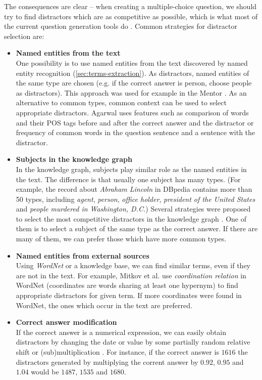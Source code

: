 \documentclass[a4paper, 12pt, twoside]{fithesis2}		%
\renewcommand{\_}{\leavevmode \kern0.07em\vbox{\hrule width0.4em}}
\newcommand{\squarebullet}{\textcolor{black}{\raisebox{0.15em}{\rule{4pt}{4pt}}}}
\newcommand{\emptysquarebullet}{\textcolor{black}{\raisebox{0.10em}{\tiny$\square$}}}
\newenvironment{myItemize}{
  \begin{itemize}[leftmargin=2em,rightmargin=1em,itemsep=\parskip ,parsep=0em,topsep=0em,partopsep=0em]
  \renewcommand{\labelitemi}{\squarebullet}
  \renewcommand{\labelitemii}{\textbullet}
}{
  \end{itemize}
}
\newcounter{choice}
\begin{document}
The consequences are clear -- when creating a multiple-choice question, we should try to find distractors which are as competitive as possible,
which is what most of the current question generation tools do
\cite{question-gen-mitkov, question-gen-textbooks, mentor}.
Common strategies for distractor selection are:
\begin{myItemize}
\item \textbf{Named entities from the text}\\
  One possibility is to use named entities from the text discovered by named entity recognition (\autoref{sec:terms-extraction}). As distractors, named entities of the same type are chosen (e.g. if the correct answer is person, choose people as distractors). This approach was used for example in the Mentor \cite{mentor}.
As an alternative to common types, common context can be used to select appropriate distractors.
Agarwal \cite{question-gen-textbooks} uses features such as comparison of words and their POS tags before and after the correct answer and the distractor or frequency of common words in the question sentence and a sentence with the distractor.

\item \textbf{Subjects in the knowledge graph}\\
In the knowledge graph, subjects play similar role as the named entities in the text.
The difference is that usually one subject has many types.
(For example, the record about \emph{Abraham Lincoln} in DBpedia contains more than 50 types, including
\emph{agent}, \emph{person}, \emph{office holder}, \emph{president of the United States} and \emph{people murdered in Washington, D.C.})
Several strategies were proposed to select the most competitive distractors in the knowledge graph \cite{ontoque, question-gen-domain-ontologies}. One of them is to select a subject of the same type as the correct answer. If there are many of them, we can prefer those which have more common types.

\item \textbf{Named entities from external sources}\\
  Using \textit{WordNet} \cite{wordnet} or a knowledge base, we can find similar terms, even if they are not in the text. For example, Mitkov et al. \cite{question-gen-mitkov} use \textit{coordination relation} in WordNet (coordinates are words sharing at least one hypernym) to find appropriate distractors for given term. If more coordinates were found in WordNet, the ones which occur in the text are preferred.

\item \textbf{Correct answer modification}\\
  If the correct answer is a numerical expression, we can easily obtain distractors by changing the date or value by some partially random relative shift or (sub)multiplication
\cite{question-gen-domain-ontologies}.
For instance, if the correct answer is $1616$ the distractors generated by multiplying the corrent answer by $0.92$, $0.95$ and $1.04$ would be $1487$, $1535$ and $1680$.
\end{myItemize}
\end{document}
